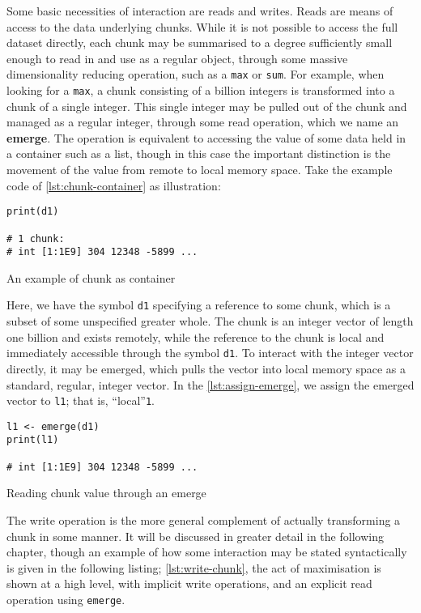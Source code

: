 Some basic necessities of interaction are reads and writes. Reads are
means of access to the data underlying chunks. While it is not possible
to access the full dataset directly, each chunk may be summarised to a
degree sufficiently small enough to read in and use as a regular object,
through some massive dimensionality reducing operation, such as a
\texttt{max} or \texttt{sum}. For example, when looking for a
\texttt{max}, a chunk consisting of a billion integers is transformed
into a chunk of a single integer. This single integer may be pulled out
of the chunk and managed as a regular integer, through some read
operation, which we name an \textbf{emerge}. The operation is equivalent
to accessing the value of some data held in a container such as a list,
though in this case the important distinction is the movement of the
value from remote to local memory space. Take the example code of \cref{lst:chunk-container}
as illustration:

\begin{listing}
    \begin{verbatim}
print(d1)

# 1 chunk:
# int [1:1E9] 304 12348 -5899 ...
    \end{verbatim}
    \caption{An example of chunk as container}
    \label{lst:chunk-container}
\end{listing}

Here, we have the symbol \texttt{d1} specifying a reference to some
chunk, which is a subset of some unspecified greater whole. The chunk is
an integer vector of length one billion and exists remotely, while the
reference to the chunk is local and immediately accessible through the
symbol \texttt{d1}. To interact with the integer vector directly, it may
be emerged, which pulls the vector into local memory space as a
standard, regular, integer vector. In the \cref{lst:assign-emerge}, we assign
the emerged vector to \texttt{l1}; that is, ``local''\texttt{1}.

\begin{listing}
    \begin{verbatim}
l1 <- emerge(d1)
print(l1)

# int [1:1E9] 304 12348 -5899 ...
    \end{verbatim}
    \caption{Reading chunk value through an emerge}
    \label{lst:assign-emerge}
\end{listing}

The write operation is the more general complement of actually
transforming a chunk in some manner. It will be discussed in greater
detail in the following chapter, though an example of how some
interaction may be stated syntactically is given in the following
listing; \cref{lst:write-chunk}, the act of maximisation is shown at a high level, with
implicit write operations, and an explicit read operation using
\texttt{emerge}.

